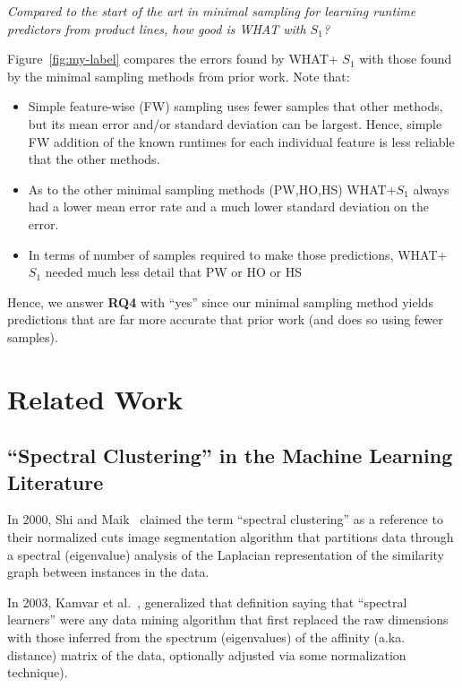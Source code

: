 \documentclass{sig-alternative}
\newcommand{\bi}{\begin{itemize}}%
\newcommand{\ei}{\end{itemize}}
\newcommand{\fig}[1]{Figure~\ref{fig:#1}}
\begin{document}
{\em Compared to the start of the art in minimal sampling for
learning runtime predictors from product lines, how good is WHAT with $S_1$?}







\fig{my-label} compares the errors found by  WHAT+ $S_1$ with those found by the minimal sampling
methods from prior work. Note that:
\bi
\item
Simple feature-wise (FW) sampling uses fewer samples that 
other methods, but its mean error and/or standard deviation can be largest. Hence, simple FW addition
of the known runtimes for each individual feature is less reliable that the other methods.
\item
As to the other minimal sampling methods  (PW,HO,HS)  WHAT+$S_1$ always had a   lower mean
error rate and a much lower standard deviation on the error.  
\item In terms of number of samples required to make those predictions, WHAT+$S_1$ needed
much less detail that PW or HO or HS
\ei

Hence, we answer {\bf RQ4} with ``yes''
since our minimal sampling method yields predictions that are far more accurate that prior
work (and does so using fewer samples).



 \section{Related Work}
 \subsection{``Spectral Clustering'' in the  Machine Learning Literature}\label{sect:related}
 
In 2000, Shi and Maik~\cite{shi00} claimed the term ``spectral clustering'' as a reference to their normalized cuts
image
segmentation algorithm that  partitions data through a spectral (eigenvalue) analysis of the  
Laplacian representation of the similarity graph between instances in the data.

In 2003, Kamvar et al.~\cite{kamvar2003spectral},  generalized that definition saying that ``spectral learners''
were any data mining algorithm that first replaced the raw
dimensions with those inferred from the spectrum (eigenvalues) of the affinity (a.ka. distance)
matrix of the data, optionally adjusted via some normalization technique).
\end{document}
